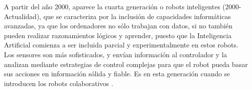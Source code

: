 A partir del año 2000, aparece la cuarta generación o robots inteligentes (2000-Actualidad), que se caracteriza por la inclusión de capacidades informáticas avanzadas, ya que los ordenadores no sólo trabajan con datos, si no también pueden realizar razonamientos lógicos y aprender, puesto que la Inteligencia Artificial comienza a ser incluida parcial y experimentalmente en estos robots. Los sensores son más sofisticados, y envían información al controlador y la analizan mediante estrategias de control complejas para que el robot pueda basar sus acciones en información sólida y fiable. Es en esta generación cuando se introducen los robots colaborativos \cite{Zamalloa17}.\\
\pagebreak
  
  
  

  
